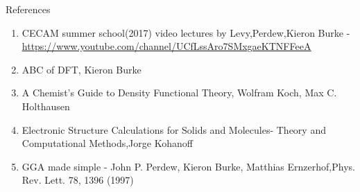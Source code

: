 \documentclass{beamer}
\begin{document}
	\begin{frame}[t]{References}
	 \begin{enumerate}
	 \item{CECAM summer school(2017) video lectures by Levy,Perdew,Kieron Burke - \\ \small\underline{\url{https://www.youtube.com/channel/UCfLssAro7SMxgaeKTNFFeeA}}}
	 \item{ABC of DFT, Kieron Burke}
	 \item{A Chemist’s Guide to
Density Functional Theory, Wolfram Koch, Max C. Holthausen}
	 \item{Electronic Structure Calculations for Solids and Molecules- Theory and Computational Methods,Jorge Kohanoff}
	 \item{GGA made simple - John P. Perdew, Kieron Burke, Matthias Ernzerhof,Phys. Rev. Lett. 78, 1396 (1997)}
	 \end{enumerate}
	\end{frame}
\end{document}
